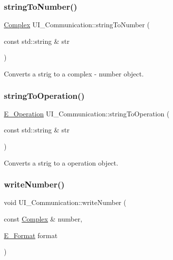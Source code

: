 \subsubsection{\texorpdfstring{string\+To\+Number()}{stringToNumber()}}
{\footnotesize\ttfamily \mbox{\hyperlink{class_complex}{Complex}} U\+I\+\_\+\+Communication\+::string\+To\+Number (\begin{DoxyParamCaption}\item[{const std\+::string \&}]{str }\end{DoxyParamCaption})}



Converts a strig to a complex -\/ number object. 

\mbox{\label{class_u_i___communication_aceca172436990f48b2bfd27f2c180423}} 
\subsubsection{\texorpdfstring{string\+To\+Operation()}{stringToOperation()}}
{\footnotesize\ttfamily \mbox{\hyperlink{_calculation_8h_a57e7c508a7a8b39e59743eb5a00b2ef7}{E\+\_\+\+Operation}} U\+I\+\_\+\+Communication\+::string\+To\+Operation (\begin{DoxyParamCaption}\item[{const std\+::string \&}]{str }\end{DoxyParamCaption})}



Converts a strig to a operation object. 

\mbox{\label{class_u_i___communication_a09b78ff23be1ef53673a0357e02368e4}} 
\subsubsection{\texorpdfstring{write\+Number()}{writeNumber()}}
{\footnotesize\ttfamily void U\+I\+\_\+\+Communication\+::write\+Number (\begin{DoxyParamCaption}\item[{const \mbox{\hyperlink{class_complex}{Complex}} \&}]{number,  }\item[{\mbox{\hyperlink{_complex_8h_adaa0992033b28ba1421a05c029ffa82e}{E\+\_\+\+Format}}}]{format }\end{DoxyParamCaption})}



